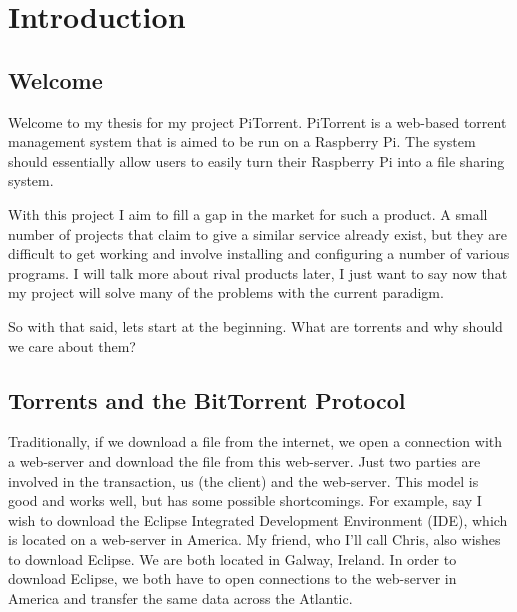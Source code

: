 
\chapter{Introduction} %

\label{Chapter1} %



\section{Welcome}
Welcome to my thesis for my project PiTorrent. PiTorrent is a web-based torrent management system that is aimed to be run on a Raspberry Pi. The system should essentially allow users to easily turn their Raspberry Pi into a file sharing system. 

With this project I aim to fill a gap in the market for such a product. A small number of projects that claim to give a similar service already exist, but they are difficult to get working and involve installing and configuring a number of various programs. I will talk more about rival products later, I just want to say now that my project will solve many of the problems with the current paradigm.

So with that said, lets start at the beginning. What are torrents and why should we care about them?


\section{Torrents and the BitTorrent Protocol}
Traditionally, if we download a file from the internet, we open a connection with a web-server and download the file from this web-server. Just two parties are involved in the transaction, us (the client) and the web-server. This model is good and works well, but has some possible shortcomings. For example, say I wish to download the Eclipse Integrated Development Environment (IDE), which is located on a web-server in America. My friend, who I'll call Chris, also wishes to download Eclipse. We are both located in Galway, Ireland. In order to download Eclipse, we both have to open connections to the web-server in America and transfer the same data across the Atlantic.

